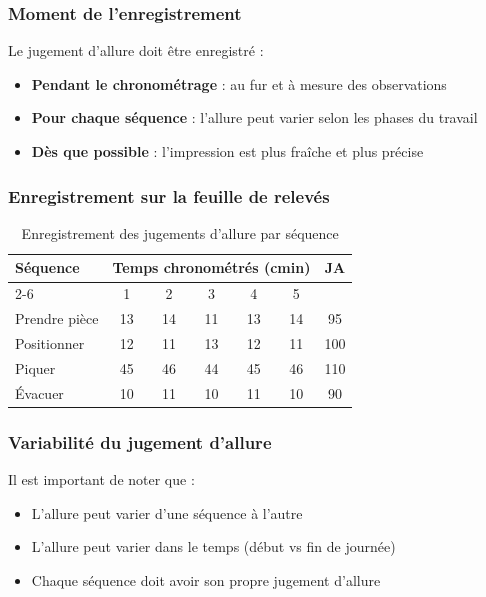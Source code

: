 \documentclass[a4paper,12pt]{article}
\begin{document}
\subsubsection{Moment de l'enregistrement}

Le jugement d'allure doit être enregistré :
\begin{itemize}
    \item \textbf{Pendant le chronométrage} : au fur et à mesure des observations
    \item \textbf{Pour chaque séquence} : l'allure peut varier selon les phases du travail
    \item \textbf{Dès que possible} : l'impression est plus fraîche et plus précise
\end{itemize}

\subsubsection{Enregistrement sur la feuille de relevés}

\begin{table}[ht]
\centering
\begin{tabular}{|l|c|c|c|c|c|c|}
\hline
\textbf{Séquence} & \multicolumn{5}{|c|}{\textbf{Temps chronométrés (cmin)}} & \textbf{JA} \\
\cline{2-6}
 & 1 & 2 & 3 & 4 & 5 & \\
\hline
Prendre pièce & 13 & 14 & 11 & 13 & 14 & 95 \\
Positionner & 12 & 11 & 13 & 12 & 11 & 100 \\
Piquer & 45 & 46 & 44 & 45 & 46 & 110 \\
Évacuer & 10 & 11 & 10 & 11 & 10 & 90 \\
\hline
\end{tabular}
\caption{Enregistrement des jugements d'allure par séquence}
\end{table}

\subsubsection{Variabilité du jugement d'allure}

Il est important de noter que :
\begin{itemize}
    \item L'allure peut varier d'une séquence à l'autre
    \item L'allure peut varier dans le temps (début vs fin de journée)
    \item Chaque séquence doit avoir son propre jugement d'allure
\end{itemize}
\end{document}
